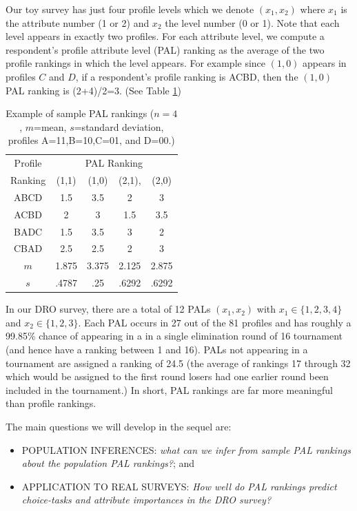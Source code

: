 \documentclass[a4paper, 12pt]{article}
\begin{document}
Our toy survey has just four profile levels which we denote $(x_1,x_2)$ where $x_1$ is the attribute number (1 or 2) and $x_2$ the level number (0 or 1). Note that each level appears in exactly two profiles. For each attribute level, we compute a respondent's profile attribute level (PAL) ranking as the average of the two profile rankings in which the level appears.  For example since $(1,0)$ appears in profiles $C$ and $D$, if a respondent's profile ranking is ACBD, then the $(1,0)$ PAL ranking is (2+4)/2=3. (See Table \ref{PAL1})


\begin{table}[!htpb]
	
	\centering
	\begin{tabular}{c|cccc}
		Profile&\multicolumn{4}{c}{PAL Ranking}\\
		Ranking&(1,1)&(1,0)&(2,1),&(2,0)\\\hline
		ABCD& 1.5&3.5&2&3\\
		ACBD& 2&3&1.5&3.5\\
		BADC&1.5&3.5&3&2 \\
		CBAD& 2.5&2.5&2&3 \\\hline
		$m$&1.875&3.375&2.125&2.875\\
		$s$ &.4787&.25&.6292&.6292\\
	\end{tabular}
	\caption{Example of sample PAL rankings ($n=4$, $m$=mean, $s$=standard deviation, profiles A=11,B=10,C=01, and D=00.)}
	\label{PAL1}
\end{table}



In our DRO survey, there are  a total of 12 PALs $(x_1,x_2)$ with $x_1\in\{1,2,3,4\}$ and $x_2\in\{1,2,3\}$. Each PAL occurs in 27 out of the 81 profiles and has roughly a 99.85\% chance of appearing in a  in a single elimination round of 16 tournament (and hence have a ranking between 1 and 16). PALs not appearing in a tournament are assigned a ranking of 24.5 (the average of rankings 17 through 32 which would be assigned to the first round losers had one earlier round been included in the tournament.)  In short, PAL rankings are far more meaningful than profile rankings.



The main questions we will develop in the sequel are: 
\begin{itemize}
\item POPULATION INFERENCES: \emph{what can we infer from sample PAL rankings about the population PAL rankings?}; and
\item APPLICATION TO REAL SURVEYS:  \emph{How well do PAL rankings predict  choice-tasks and attribute importances in the DRO survey?}
\end{itemize}
\end{document}
